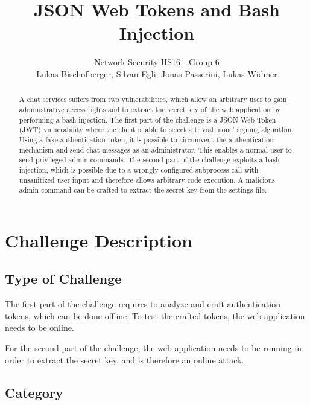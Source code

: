 \documentclass[12pt,a4paper]{article}
\title{JSON Web Tokens and Bash Injection} %
\author{Network Security HS16 - Group 6\\Lukas Bischofberger, Silvan Egli, Jonas Passerini, Lukas Widmer}
\begin{document}
\maketitle

\begin{abstract}

A chat services suffers from two vulnerabilities, which allow an arbitrary user to gain administrative access rights and to extract the secret key of the web application by performing a bash injection.
The first part of the challenge is a JSON Web Token (JWT) vulnerability where the client is able to select a trivial 'none' signing algorithm. Using a fake authentication token, it is possible to circumvent the authentication mechanism and send chat messages as an administrator. This enables a normal user to send privileged admin commands.
The second part of the challenge exploits a bash injection, which is possible due to a wrongly configured subprocess call with unsanitized user input and therefore allows arbitrary code execution. A malicious admin command can be crafted to extract the secret key from the settings file.

\end{abstract}

\section{Challenge Description}

\subsection{Type of Challenge}

The first part of the challenge requires to analyze and craft authentication tokens, which can be done offline. To test the crafted tokens, the web application needs to be online.

For the second part of the challenge, the web application needs to be running in order to extract the secret key, and is therefore an online attack.


\subsection{Category}
\end{document}
